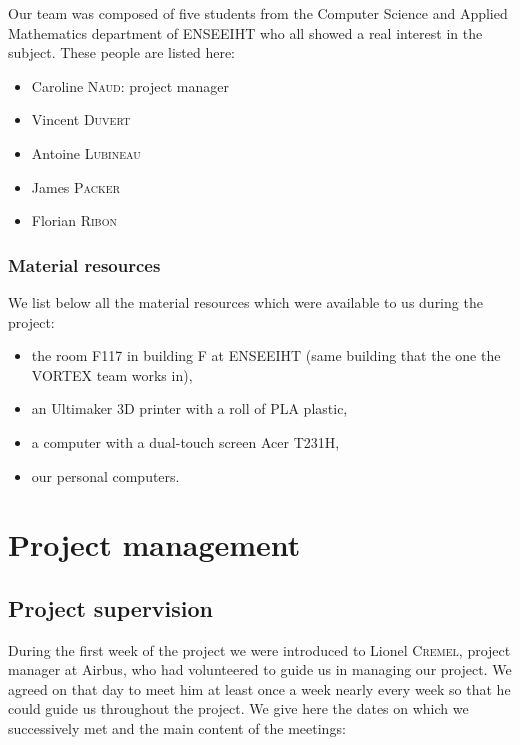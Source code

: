 \documentclass{report}
\begin{document}
	Our team was composed of five students from the Computer Science and Applied Mathematics department of ENSEEIHT who all showed a real interest in the subject. These people are listed here:

\begin{itemize}
	\item Caroline \textsc{Naud}: project manager
	\item Vincent \textsc{Duvert}
	\item Antoine \textsc{Lubineau}
	\item James \textsc{Packer}
	\item Florian \textsc{Ribon}
\end{itemize}

\subsection{Material resources}

	We list below all the material resources which were available to us during the project:

\begin{itemize}
	\item the room F117 in building F at ENSEEIHT (same building that the one the \textsc{VORTEX} team works in),
	\item an Ultimaker 3D printer with a roll of PLA plastic,
	\item a computer with a dual-touch screen Acer T231H,
	\item our personal computers.
\end{itemize}

\chapter{Project management}

\section{Project supervision}

	During the first week of the project we were introduced to Lionel \textsc{Cremel}, project manager at Airbus, who had volunteered to guide us in managing our project. We agreed on that day to meet him at least once a week nearly every week so that he could guide us throughout the project. We give here the dates on which we successively met and the main content of the meetings:
	
\end{document}
